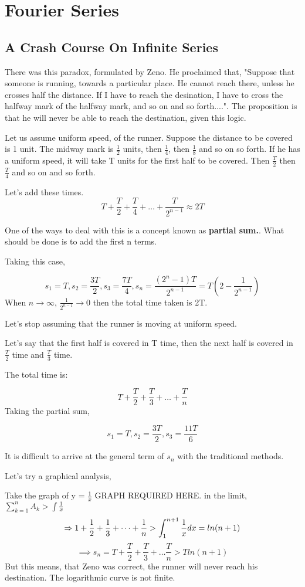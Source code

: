\documentclass[twoside]{report}
\begin{document}
\chapter{Fourier Series} %
\section{A Crash Course On Infinite Series} %
There was this paradox, formulated by Zeno. He proclaimed that, "Suppose that someone is running, towards  a particular place. He cannot reach there, unless he crosses half the distance. If I have to reach the desination, I have to cross the halfway mark of the halfway mark, and so on and so forth....". The proposition is that he will never be able to reach the destination, given this logic.

Let us assume uniform speed, of the runner. Suppose the distance to be covered is 1 unit. The midway mark is $\frac{1}{2}$ units, then $\frac{1}{4}$, then $\frac{1}{8}$ and so on so forth. If he has a uniform speed, it will take T units for the first half to be covered. Then $\frac{T}{2}$ then $\frac{T}{4}$ and so on and so forth. 

Let's add these times. 
\[
   T + \frac{T}{2} + \frac{T}{4} + \dots + \frac{T}{2^{n-1}} \approx 2T
\]

One of the ways to deal with this is a concept known as \textbf{partial sum.}. What should be done is to add the first n terms.

Taking this case,

\[
s_1 = T, s_2 = \frac{3T}{2}, s_3 = \frac{7T}{4}, s_n = \frac{(2^{n} -1)T}{2^{n-1}} = T(2- \frac{1}{2^{n-1}})
\]
When $n \rightarrow \infty$, $\frac{1}{2^{n-1}} \rightarrow 0$ then the total time taken is 2T.

Let's stop assuming that the runner is moving at uniform speed.

Let's say that the first half is covered in T time, then the next half is covered in $\frac{T}{2}$ time and $\frac{T}{3}$ time.

The total time is:

\[T + \frac{T}{2} + \frac{T}{3} + \dots + \frac{T}{n} \]
Taking the partial sum,

\[s_1 = T, s_2=\frac{3T}{2}, s_3 = \frac{11T}{6}\]

It is difficult to arrive at the general term of $s_n$ with the traditional methods.

Let's try a graphical analysis,

Take the graph of y = $\frac{1}{x}$
GRAPH REQUIRED HERE.
\newline
in the limit, $\sum_{k=1}^{n}A_k > \int \frac{1}{x}$
\[
\implies 1 + \frac{1}{2} + \frac{1}{3} + \dots + \frac{1}{n} > \int_{1}^{n+1} \frac{1}{x} dx = ln(n+1)\\ 
\]
\[
\implies s_n = T + \frac{T}{2} + \frac{T}{3} + \dots \frac{T}{n} > T ln(n+1)
\]
But this means, that Zeno was correct, the runner will never reach his destination.
The logarithmic curve is not finite. 
\end{document}
